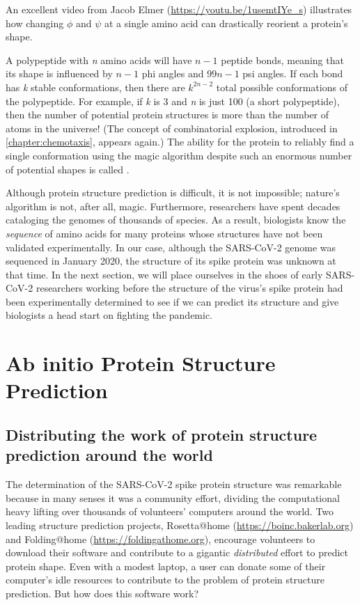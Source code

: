An excellent video from Jacob Elmer (\url{https://youtu.be/1usemtIYe_s}) illustrates how changing $\phi$ and $\psi$ at a single amino acid can drastically reorient a protein's shape.

A polypeptide with \textit{n} amino acids will have $n - 1$ peptide bonds, meaning that its shape is influenced by $n - 1$ phi angles and $99 n - 1$ psi angles. If each bond has \textit{k} stable conformations, then there are $k^{2n-2}$ total possible conformations of the polypeptide. For example, if \textit{k} is 3 and \textit{n} is just 100 (a short polypeptide), then the number of potential protein structures is more than the number of atoms in the universe! (The concept of combinatorial explosion, introduced in \autoref{chapter:chemotaxis}, appears again.) The ability for the protein to reliably find a single conformation using the magic algorithm despite such an enormous number of potential shapes is called .

Although protein structure prediction is difficult, it is not impossible; nature's algorithm is not, after all, magic. Furthermore, researchers have spent decades cataloging the genomes of thousands of species. As a result, biologists know the \textit{sequence} of amino acids for many proteins whose structures have not been validated experimentally. In our case, although the SARS-CoV-2 genome was sequenced in January 2020, the structure of its spike protein was unknown at that time.  In the next section, we will place ourselves in the shoes of early SARS-CoV-2 researchers working before the structure of the virus's spike protein had been experimentally determined to see if we can predict its structure and give biologists a head start on fighting the pandemic.\\


\FloatBarrier
{}

\section{Ab initio Protein Structure Prediction}
\label{sec:ab_initio}
\subsection{Distributing the work of protein structure prediction around the world}

The determination of the SARS-CoV-2 spike protein structure was remarkable because in many senses it was a community effort, dividing the computational heavy lifting over thousands of volunteers' computers around the world. Two leading structure prediction projects, Rosetta@home (\url{https://boinc.bakerlab.org}) and Folding@home (\url{https://foldingathome.org}), encourage volunteers to download their software and contribute to a gigantic \textit{distributed} effort to predict protein shape. Even with a modest laptop, a user can donate some of their computer's idle resources to contribute to the problem of protein structure prediction. But how does this software work?

